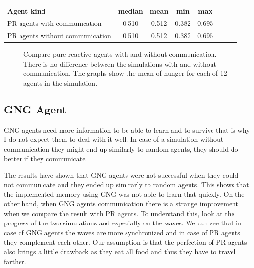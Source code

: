\begin{center}   
  \begin{tabular}{l*{6}{c}r}
  Agent kind        & median & mean & min & max \\
  \hline  
  PR agents with communication        & 0.510 & 0.512 & 0.382 & 0.695 \\
  PR agents without communication     & 0.510 & 0.512 & 0.382 & 0.695 \\
  \end{tabular}                  
\end{center}


\begin{figure}[h!]
  \centering       
  \caption{Compare pure reactive agents with and without communication. There is no difference between the simulations with and without communication. The graphs show the mean of hunger for each of 12 agents in the simulation.}
\end{figure} 

\clearpage

\subsection{GNG Agent}

GNG agents need more information to be able to learn and to survive that is why I do not expect them to deal with it well. In case of a simulation without communication they might end up similarly to random agents, they should do better if they communicate.

The results have shown that GNG agents were not successful when they could not communicate and they ended up simirarly to random agents. This shows that the implemented memory using GNG was not able to learn that quickly. On the other hand, when GNG agents communication there is a strange improvement when we compare the result with PR agents. To understand this, look at the progress of the two simulations and especially on the waves. We can see that in case of GNG agents the waves are more synchronized and in case of PR agents they complement each other. Our assumption is that the perfection of PR agents also brings a little drawback as they eat all food and thus they have to travel farther.

